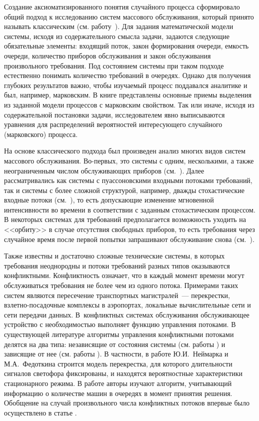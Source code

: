 Создание аксиоматизированного понятия случайного процесса сформировало общий подход к исследованию систем массового обслуживания, который принято называть классическим (см. работу~\cite{Fedotkin:1996}). Для задания математической модели системы, исходя из содержательного смысла задачи, задаются следующие обязательные элементы: входящий поток, закон формирования очереди, емкость очереди, количество приборов обслуживания и закон обслуживания произвольного требования. Под состоянием системы при таком подходе естественно понимать количество требований в очередях. Однако для получения глубоких результатов важно, чтобы изучаемый процесс поддавался аналитике и был, например, марковским. В книге \cite{GnedenkoKovalenko} представлены основные приемы выделения из заданной модели процессов с марковским свойством. Так или иначе, исходя из содержательной постановки задачи, исследователем явно выписываются уравнения для распределений вероятностей интересующего случайного (марковского) процесса.

На основе классического подхода был произведен анализ многих видов систем массового обслуживания. Во-первых, это системы с одним, несколькими, а также неограниченным числом обслуживающих приборов (см.~\cite{afanasyeva, tatashev, brumelle}). Далее рассматривались как системы с пуассоновскими входными потоками требований, так и системы с более сложной структурой, например, дважды стохастические входные потоки (см.~\cite{dudin:1997, Grandell:1976, Neuts:1979}), то есть допускающие изменение мгновенной интенсивности во времени в соответствии с заданным стохастическим процессом. В некоторых системах для требований предполагается возможность  уходить на <<орбиту>> в случае отсутствия свободных приборов, то есть требования через случайное время после первой попытки запрашивают обслуживание снова (см.~\cite{fallin}). 

Также известны и достаточно сложные технические системы, в которых требования неоднородны и потоки требований разных типов оказываются конфликтными. Конфликтность означает, что в каждый момент времени могут обслуживаться требования не более чем из одного потока. Примерами таких систем являются пересечение транспортных магистралей~--- перекрестки, взлетно-посадочные комплексы в аэропортах, локальные вычислительные сети и сети передачи данных. В~конфликтных системах обслуживания обслуживающее устройство с необходимостью выполняет функцию управления потоками. В существующей литературе алгоритмы управления конфликтными потоками делятся на два типа: независящие от состояния системы (см. работы \cite{Darroch:1964,Neimark:1966}) и зависящие от нее  (см. работы \cite{Neimark:1968, Fedotkin:1976, Ferguson:1985, Takagi:1985}). В частности, в работе Ю.И.~Неймарка и М.А.~Федоткина \cite{Neimark:1966} строится модель перекрестка, для которого длительности сигналов светофора фиксированы, и находятся вероятностные характеристики стационарного режима. В работе \cite{Neimark:1968} авторы изучают алгоритм, учитывающий информацию о количестве машин в очередях в момент принятия решения. Обобщение на случай произвольного числа конфликтных потоков впервые было осуществлено в статье \cite{Yakushev:1990}.

